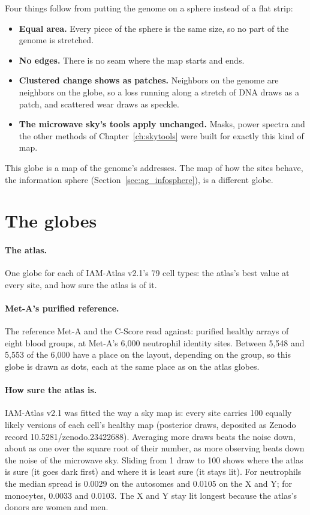 Four things follow from putting the genome on a sphere instead of a flat strip:
\begin{itemize}
\item \textbf{Equal area.} Every piece of the sphere is the same size, so no part of the genome is stretched.
\item \textbf{No edges.} There is no seam where the map starts and ends.
\item \textbf{Clustered change shows as patches.} Neighbors on the genome are neighbors on the globe, so a loss running along a
stretch of DNA draws as a patch, and scattered wear draws as speckle.
\item \textbf{The microwave sky's tools apply unchanged.} Masks, power spectra and the other methods of Chapter~\ref{ch:skytools} were
built for exactly this kind of map.
\end{itemize}
This globe is a map of the genome's addresses. The map of how the sites behave, the information sphere
(Section~\ref{sec:ag_infosphere}), is a different globe.

\section{The globes}

\paragraph{The atlas.} One globe for each of IAM-Atlas v2.1's 79 cell types: the atlas's best value at every site, and how sure
the atlas is of it.

\paragraph{Met-A's purified reference.} The reference Met-A and the C-Score read against: purified healthy arrays of eight blood
groups, at Met-A's 6{,}000 neutrophil identity sites. Between 5{,}548 and 5{,}553 of the 6{,}000 have a place on the layout, depending
on the group, so this globe is drawn as dots, each at the same place as on the atlas globes.

\paragraph{How sure the atlas is.} IAM-Atlas v2.1 was fitted the way a sky map is: every site carries 100 equally likely versions of
each cell's healthy map (posterior draws, deposited as Zenodo record 10.5281/zenodo.23422688). Averaging more draws beats the noise
down, about as one over the square root of their number, as more observing beats down the noise of the microwave sky. Sliding from 1
draw to 100 shows where the atlas is sure (it goes dark first) and where it is least sure (it stays lit). For neutrophils the median
spread is 0.0029 on the autosomes and 0.0105 on the X and Y; for monocytes, 0.0033 and 0.0103. The X and Y stay lit longest because
the atlas's donors are women and men.

